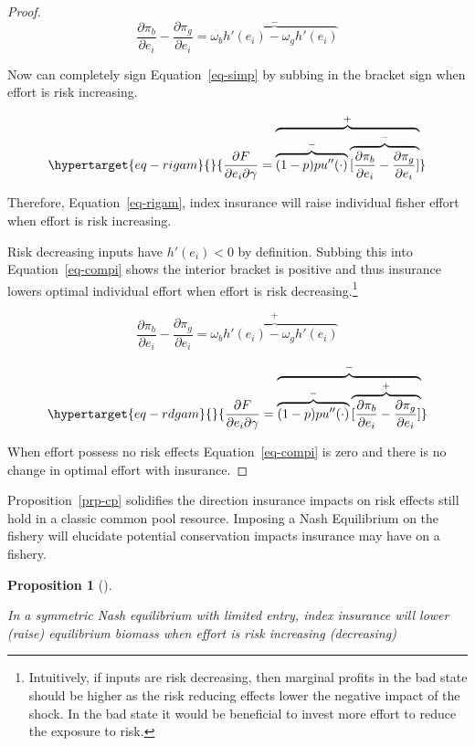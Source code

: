 \documentclass[
  letterpaper,
  DIV=11,
  numbers=noendperiod]{scrartcl}
\theoremstyle{plain}
\theoremstyle{plain}
\newtheorem{proposition}{Proposition}[section]
\theoremstyle{remark}
\begin{document}
\begin{proof}
\[
\frac{\partial \pi_b}{\partial e_i}-\frac{\partial \pi_g}{\partial e_i}=\overbrace{\omega_bh'(e_i)-\omega_gh'(e_i)}^{-}
\]

Now can completely sign Equation~\ref{eq-simp} by subbing in the bracket
sign when effort is risk increasing.

\begin{equation}\protect\hypertarget{eq-rigam}{}{
\frac{\partial F}{\partial e_i \partial \gamma}=\overbrace{\overbrace{(1-p)pu''(\cdot)}^{-}\overbrace{[\frac{\partial \pi_b}{\partial e_i}-\frac{\partial \pi_g}{\partial e_i}]}^{-}}^{+}
}\label{eq-rigam}\end{equation}

Therefore, Equation~\ref{eq-rigam}, index insurance will raise
individual fisher effort when effort is risk increasing.

Risk decreasing inputs have \(h'(e_i)<0\) by definition. Subbing this
into Equation~\ref{eq-compi} shows the interior bracket is positive and
thus insurance lowers optimal individual effort when effort is risk
decreasing.\footnote{Intuitively, if inputs are risk decreasing, then
  marginal profits in the bad state should be higher as the risk
  reducing effects lower the negative impact of the shock. In the bad
  state it would be beneficial to invest more effort to reduce the
  exposure to risk.}

\[
\frac{\partial \pi_b}{\partial e_i}-\frac{\partial \pi_g}{\partial e_i}=\overbrace{\omega_bh'(e_i)-\omega_gh'(e_i)}^{+}
\]

\begin{equation}\protect\hypertarget{eq-rdgam}{}{
\frac{\partial F}{\partial e_i \partial \gamma}=\overbrace{\overbrace{(1-p)pu''(\cdot)}^{-}\overbrace{[\frac{\partial \pi_b}{\partial e_i}-\frac{\partial \pi_g}{\partial e_i}]}^{+}}^{-}
}\label{eq-rdgam}\end{equation}

When effort possess no risk effects Equation~\ref{eq-compi} is zero and
there is no change in optimal effort with insurance.

\end{proof}

Proposition~\ref{prp-cp} solidifies the direction insurance impacts on
risk effects still hold in a classic common pool resource. Imposing a
Nash Equilibrium on the fishery will elucidate potential conservation
impacts insurance may have on a fishery.

\begin{proposition}[]\protect\hypertarget{prp-synas}{}\label{prp-synas}

In a symmetric Nash equilibrium with limited entry, index insurance will
lower (raise) equilibrium biomass when effort is risk increasing
(decreasing)

\end{proposition}
\end{document}
